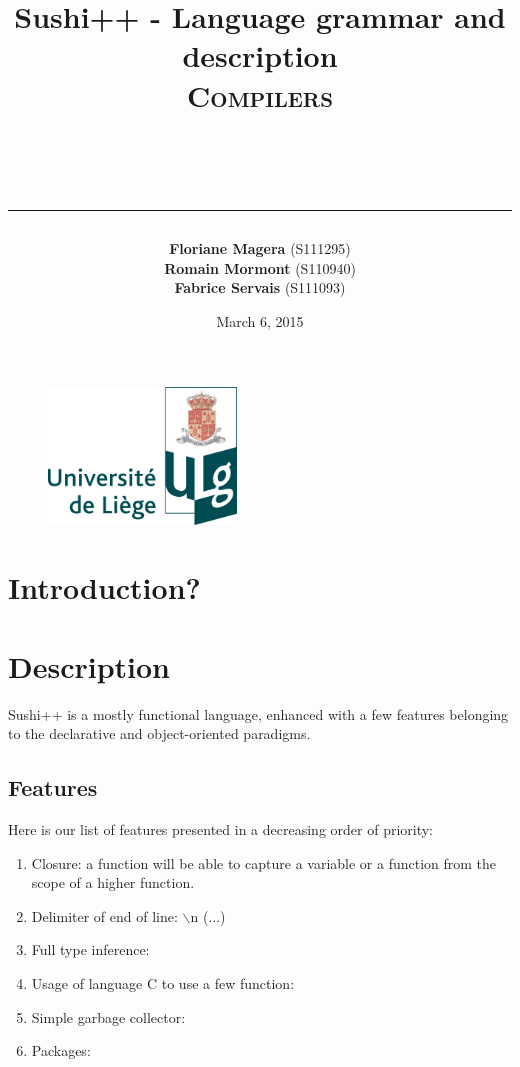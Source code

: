 \documentclass[a4paper,titlepage]{article}
\begin{document}
\begin{titlepage}

\begin{figure}
\centering
\includegraphics[width=5cm]{logo-ulg.png}
\end{figure}



\title{
\vspace{0.2cm}
\LARGE{\textbf{Sushi++ - Language grammar and description}} \\ \textsc{Compilers}
\author{\textbf{Floriane Magera} \small{(S111295})\\\textbf{Romain Mormont} \small{(S110940})\\\textbf{Fabrice Servais} \small{(S111093})}\\
\date{March 6, 2015}
\rule{15cm}{1.5pt}
}

\end{titlepage}

\pagestyle{fancy}

\maketitle
  
\section{Introduction?}



\section{Description}

Sushi++ is a mostly functional language, enhanced with a few features belonging to the declarative and object-oriented paradigms.


  \subsection{Features}
Here is our list of features presented in a decreasing order of priority:
\begin{enumerate}
  \item Closure: a function will be able to capture a variable or a function from the scope of a higher function.
  \item Delimiter of end of line: $\backslash$n (...)
  \item Full type inference: 
  \item Usage of language C to use a few function: 
  \item Simple garbage collector: 
  \item Packages: 
\end{enumerate}
\end{document}
